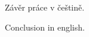 \documentclass[12pt]{article}
\newcommand{\sssection}[1]{\subsubsection{#1}}
\newcommand{\addsp}[1]{\left<#1\right>}
\DeclareMathOperator{\tfidf}{tf-idf}
\begin{document}




\begin{conclusions-cz}
  Závěr práce v češtině.
\end{conclusions-cz}


\begin{conclusions-en}
  Conclusion in english.
\end{conclusions-en}
\end{document}
